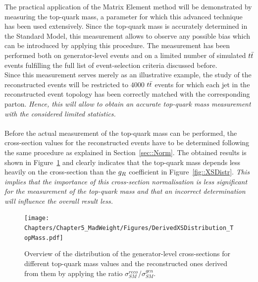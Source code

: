 The practical application of the Matrix Element method will be demonstrated by measuring the top-quark mass, a parameter for which this advanced technique has been used extensively.
Since the top-quark mass is accurately determined in the Standard Model, this measurement allows to observe any possible bias which can be introduced by applying this procedure.
The measurement has been performed both on generator-level events and on a limited number of simulated $t\bar{t}$ events fulfilling the full list of event-selection criteria discussed before.
\\
Since this measurement serves merely as an illustrative example, the study of the reconstructed events will be restricted to $4000$ $t\bar{t}$ events for which each jet in the reconstructed event topology has been correctly matched with the corresponding parton. 
\textit{Hence, this will allow to obtain an accurate top-quark mass measurement with the considered limited statistics.}
\\
\\
Before the actual measurement of the top-quark mass can be performed, the cross-section values for the reconstructed events have to be determined following the same procedure as explained in Section~\ref{sec::Norm}. The obtained results is shown in Figure~\ref{fig::XSDistrTop} and clearly indicates that the top-quark mass depends less heavily on the cross-section than the $g_{R}$ coefficient in Figure~\ref{fig::XSDistr}. 
\textit{This implies that the importance of this cross-section normalisation is less significant for the measurement of the top-quark mass and that an incorrect determination will influence the overall result less.}
\\
\begin{figure}[h!t]
 \centering
 \texttt{[image: Chapters/Chapter5\_MadWeight/Figures/DerivedXSDistribution\_TopMass.pdf]}
 \caption{Overview of the distribution of the generator-level cross-sections for different top-quark mass values and the reconstructed ones derived from them by applying the ratio $\sigma_{SM}^{reco}$/$\sigma_{SM}^{gen}$.} \label{fig::XSDistrTop}
\end{figure}

